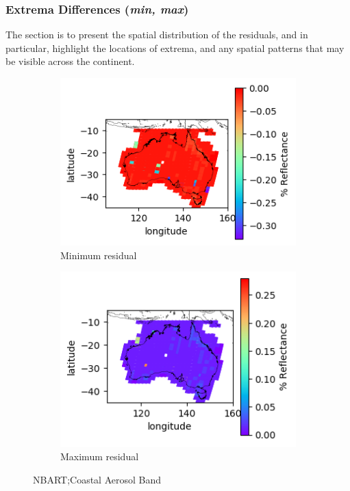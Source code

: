 \documentclass[a4paper]{article}
\begin{document}
  \clearpage

    \subsubsection{Extrema Differences (\textit{min, max})}

      \begin{flushleft}
        The section is to present the spatial distribution of the residuals, and in particular, highlight the locations of extrema, and any spatial patterns that may be visible across the continent. \par
      \end{flushleft}

      \begin{figure}[h!]
        \centering
          \begin{subfigure}[l]{.4\linewidth}
            \hspace{-32mm}
            \includegraphics[scale=0.9]{plots/nbart/nbart_coastal_aerosol-MinResidual.png}
            \caption{Minimum residual}
          \end{subfigure}
%
          \begin{subfigure}[r]{.4\linewidth}
            \includegraphics[scale=0.9]{plots/nbart/nbart_coastal_aerosol-MaxResidual.png}
            \caption{Maximum residual}
          \end{subfigure}
        \caption{NBART;\@ Coastal Aerosol Band}\label{figure:1}
      \end{figure}
\end{document}
